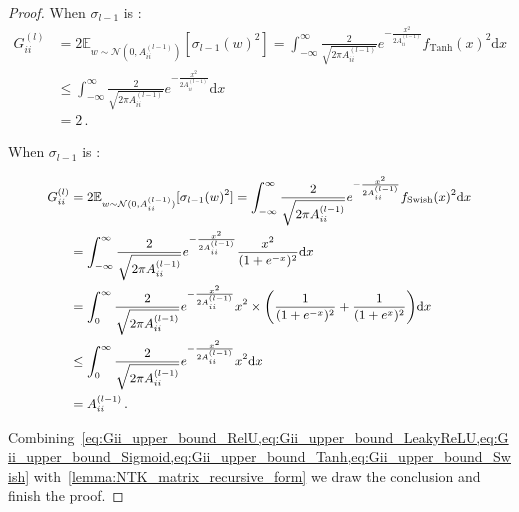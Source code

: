 \documentclass[nohyperref]{article}
\theoremstyle{plain}
\theoremstyle{definition}
\theoremstyle{remark}
\begin{document}
\begin{proof}
When $\sigma_{l-1}$ is :
\begin{equation}
\begin{split}
    G_{ii}^{(l)}&=2\mathbb{E}_{w \sim \mathcal N(0,A_{ii}^{(l-1)})}[\sigma_{l-1}(w)^2]=\int_{-\infty}^{\infty}\frac{2}{\sqrt{2\pi A_{ii}^{(l-1)}}}e^{-\frac{x^2}{2A_{ii}^{(l-1)}}}f_{\mathrm{Tanh}}(x)^2 \mathrm{d}x\\
    & \leq \int_{-\infty}^{\infty}\frac{2}{\sqrt{2\pi A_{ii}^{(l-1)}}}e^{-\frac{x^2}{2A_{ii}^{(l-1)}}}\mathrm{d}x\\
    & = 2\,.
\end{split}
\label{eq:Gii_upper_bound_Tanh}
\end{equation}

When $\sigma_{l-1}$ is :

\begin{equation}
\small
\begin{split}
G_{ii}^{(l)}&=2\mathbb{E}_{w \sim \mathcal N(0,A_{ii}^{(l-1)})}[\sigma_{l-1}(w)^2]=\int_{-\infty}^{\infty}\frac{2}{\sqrt{2\pi A_{ii}^{(l-1)}}}e^{-\frac{x^2}{2A_{ii}^{(l-1)}}}f_{\mathrm{Swish}}(x)^2 \mathrm{d}x\\
& = \int_{-\infty}^{\infty}\frac{2}{\sqrt{2\pi A_{ii}^{(l-1)}}}e^{-\frac{x^2}{2A_{ii}^{(l-1)}}}\frac{x^2}{(1+e^{-x})^2} \mathrm{d}x\\
& = \int_{0}^{\infty}\frac{2}{\sqrt{2\pi A_{ii}^{(l-1)}}}e^{-\frac{x^2}{2A_{ii}^{(l-1)}}}x^2\times \bigg(\frac{1}{(1+e^{-x})^2}+\frac{1}{(1+e^{x})^2}\bigg) \mathrm{d}x\\
& \leq \int_{0}^{\infty}\frac{2}{\sqrt{2\pi A_{ii}^{(l-1)}}}e^{-\frac{x^2}{2A_{ii}^{(l-1)}}}x^2\mathrm{d}x\\
& = A_{ii}^{(l-1)}\,.
\end{split}
\label{eq:Gii_upper_bound_Swish}
\end{equation}

Combining~\cref{eq:Gii_upper_bound_RelU,eq:Gii_upper_bound_LeakyReLU,eq:Gii_upper_bound_Sigmoid,eq:Gii_upper_bound_Tanh,eq:Gii_upper_bound_Swish} with~\cref{lemma:NTK_matrix_recursive_form} we draw the conclusion and finish the proof.
\end{proof}
\end{document}
